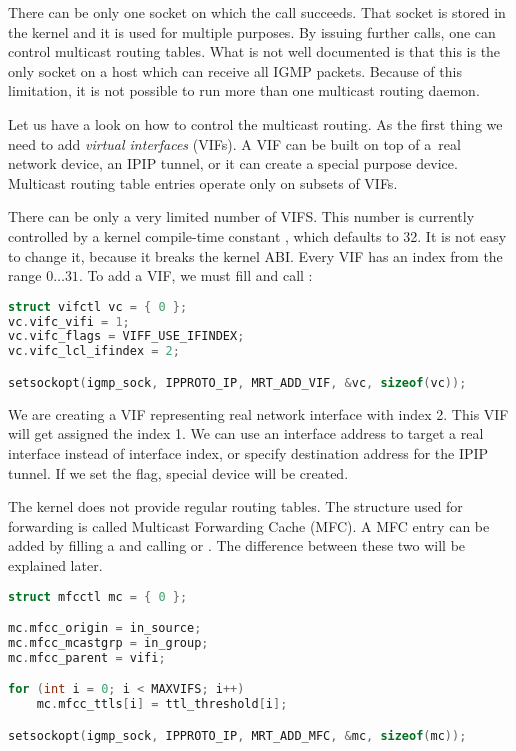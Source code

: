 There can be only one socket on which the call  succeeds. That socket
is stored in the kernel and it is used for multiple purposes. By issuing further
\setsockopt calls, one can control multicast routing tables. What is not well
documented is that this is the only socket on a host which can receive all IGMP
packets. Because of this limitation, it is not possible to run more than one
multicast routing daemon.

Let us have a look on how to control the multicast routing. As the first thing
we need to add \emph{virtual interfaces} (VIFs). A VIF can be built on top of
a~real network device, an IPIP tunnel, or it can create a special purpose device.
Multicast routing table entries operate only on subsets of VIFs.

There can be only a very limited number of VIFS. This number is currently
controlled by a kernel compile-time constant , which defaults to 32. It is not easy
to change it, because it breaks the kernel ABI. Every VIF has an index from the
range $0\dots31$. To add a VIF, we must fill  and call
:

\begin{lstlisting}[language=c]
struct vifctl vc = { 0 };
vc.vifc_vifi = 1;
vc.vifc_flags = VIFF_USE_IFINDEX;
vc.vifc_lcl_ifindex = 2;

setsockopt(igmp_sock, IPPROTO_IP, MRT_ADD_VIF, &vc, sizeof(vc));
\end{lstlisting}

\noindent We are creating a VIF representing real network interface with index 2. This VIF will
get assigned the index 1. We can use an interface address to target a real
interface instead of interface index, or specify destination address for the
IPIP tunnel. If we set the  flag, special device will be created.

The kernel does not provide regular routing tables. The structure used for
forwarding is called Multicast Forwarding Cache (MFC). A MFC entry can be added
by filling a  and calling  or
. The difference between these two will be
explained later.

\begin{lstlisting}[language=c]
struct mfcctl mc = { 0 };

mc.mfcc_origin = in_source;
mc.mfcc_mcastgrp = in_group;
mc.mfcc_parent = vifi;

for (int i = 0; i < MAXVIFS; i++)
    mc.mfcc_ttls[i] = ttl_threshold[i];

setsockopt(igmp_sock, IPPROTO_IP, MRT_ADD_MFC, &mc, sizeof(mc));
\end{lstlisting}

